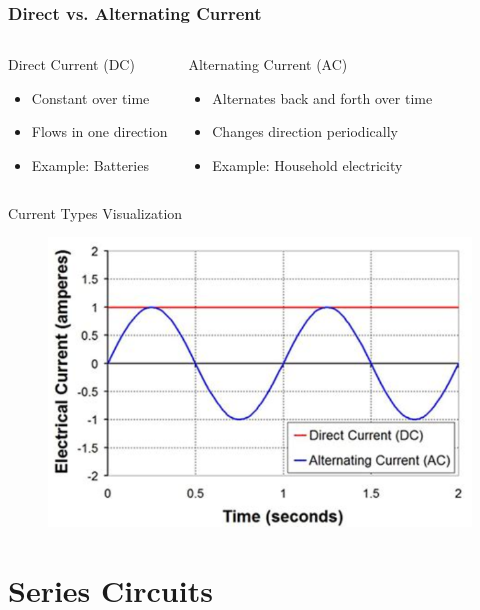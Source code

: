 \documentclass{beamer}
\begin{document}
\begin{frame}
\frametitle{Direct vs. Alternating Current}
\begin{columns}
\begin{block}{Direct Current (DC)}
\begin{itemize}
\item Constant over time
\item Flows in one direction
\item Example: Batteries
\end{itemize}
\end{block}

\begin{block}{Alternating Current (AC)}
\begin{itemize}
\item Alternates back and forth over time
\item Changes direction periodically
\item Example: Household electricity
\end{itemize}
\end{block}
\end{columns}

\begin{alertblock}{Current Types Visualization}
\begin{figure}
    \centering
    \includegraphics[width=0.5\linewidth]{cdfgrge.png}
\end{figure}
\end{alertblock}
\end{frame}

\section{Series Circuits}
\end{document}
